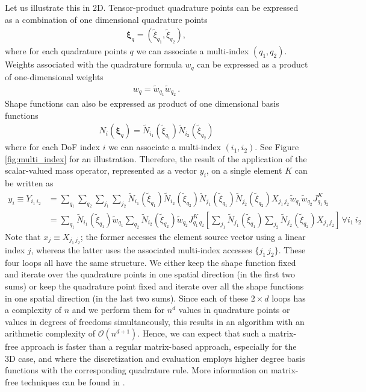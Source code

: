 \documentclass[AMA,STIX1COL]{WileyNJD-v2}
\newcommand*{\gz}[1]{\boldsymbol{#1}}
\begin{document}
Let us illustrate this in 2D. Tensor-product quadrature points can be expressed as a combination of one dimensional quadrature points
\begin{align}
  \gz \xi_q = (\widetilde{\xi}_{q_1}, \widetilde{\xi}_{q_2}),
\end{align}
where for each quadrature points $q$ we can associate a multi-index $(q_1,q_2)$.
Weights associated with the quadrature formula $w_q$ can be expressed as a product of one-dimensional weights
\begin{align}
  w_q = \widetilde{w}_{q_1} \widetilde{w}_{q_2} \, .
\end{align}
Shape functions can also be expressed as product of one dimensional basis functions
\begin{align}
  N_i(\gz \xi_q) =
  \widetilde{N}_{i_1}(\widetilde{\xi}_{q_1})
  \widetilde{N}_{i_2}(\widetilde{\xi}_{q_2})
\end{align}
where for each DoF index $i$ we can associate a multi-index $(i_1, i_2)$.
See Figure \ref{fig:multi_index} for an illustration.
%
Therefore, the result of the application of the scalar-valued mass operator, represented as a vector $y_i$, on a single element $K$ can be written as
\begin{align*}
  y_{i} \equiv Y_{i_1\,i_2} & = \sum_{q_1} \sum_{q_2} \sum_{j_1} \sum_{j_2}
  \widetilde{N}_{i_1}(\widetilde{\xi}_{q_1})
  \widetilde{N}_{i_2}(\widetilde{\xi}_{q_2})
  \widetilde{N}_{j_1}(\widetilde{\xi}_{q_1})
  \widetilde{N}_{j_2}(\widetilde{\xi}_{q_2})
  X_{j_1\,j_2}
  \widetilde{w}_{q_1} \widetilde{w}_{q_2} J^K_{q_1\,q_2}
  \\
  &=
  \sum_{q_1} \widetilde{N}_{i_1}(\widetilde{\xi}_{q_1}) \widetilde{w}_{q_1}
  \sum_{q_2} \widetilde{N}_{i_2}(\widetilde{\xi}_{q_2}) \widetilde{w}_{q_2}
  J^K_{q_1\,q_2}
  \left[
    \sum_{j_1}
    \widetilde{N}_{j_1}(\widetilde{\xi}_{q_1})
    \sum_{j_2}
    \widetilde{N}_{j_2}(\widetilde{\xi}_{q_2})
    X_{j_1\,j_2}
  \right]\, \forall i_1 \, i_2
\end{align*}
%
Note that $x_j \equiv X_{j_1\,j_2}$; the former accesses the element source vector using a linear index $j$, whereas the latter uses the associated multi-index accesses $\{j_1\,j_2\}$.
%
These four loops all have the same structure.
We either keep the shape function fixed and iterate over the quadrature points in one spatial direction (in the first two sums) or keep the quadrature point fixed and iterate over all the shape functions in one spatial direction (in the last two sums).
Since each of these $2\times d$ loops has a complexity of $n$ and we perform them for $n^d$ values in quadrature points or values in degrees of freedoms simultaneously, this results in an algorithm with an arithmetic complexity of $\mathcal{O}(n^{d+1})$.
Hence, we can expect that such a matrix-free approach is faster than a regular matrix-based approach, especially for the 3D case, and where the discretization and evaluation employs higher degree basis functions with the corresponding quadrature rule.
More information on matrix-free techniques can be found in \cite{kronbichler12,vos10}.
\end{document}
